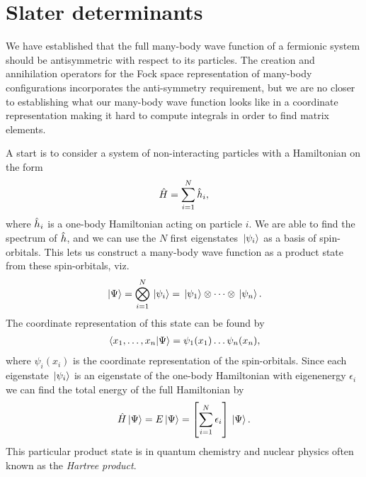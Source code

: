     \section{Slater determinants}
        \label{sec:slater-determinants}
        We have established that the full many-body wave function of a fermionic
        system should be antisymmetric with respect to its particles.
        The creation and annihilation operators for the Fock space
        representation of many-body configurations incorporates the
        anti-symmetry requirement, but we are no closer to establishing what our
        many-body wave function looks like in a coordinate representation making
        it hard to compute integrals in order to find matrix elements.

        A start is to consider a system of non-interacting particles with a
        Hamiltonian on the form
        \begin{align}
            \hat{H} = \sum_{i = 1}^{N} \hat{h}_i,
        \end{align}
        where $\hat{h}_i$ is a one-body Hamiltonian acting on particle $i$. We
        are able to find the spectrum of $\hat{h}$, and we can use the $N$
        first eigenstates $\ket*{\psi_i}$ as a basis of spin-orbitals.
        This lets us construct a many-body wave function as a product state from
        these spin-orbitals, viz.
        \begin{align}
            \ket*{\Psi}
            = \bigotimes_{i = 1}^{N}\ket*{\psi_i}
            = \ket*{\psi_1}\otimes\dots\otimes\ket*{\psi_n}.
        \end{align}
        The coordinate representation of this state can be found by
        \begin{align}
            \braket*{x_1, \dots, x_n}{\Psi}
            = \psi_1(x_1)\dots\psi_n(x_n),
        \end{align}
        where $\psi_i(x_i)$ is the coordinate representation of the
        spin-orbitals.
        Since each eigenstate $\ket*{\psi_i}$ is an eigenstate of the one-body
        Hamiltonian with eigenenergy $\epsilon_i$ we can find the total energy
        of the full Hamiltonian by
        \begin{align}
            \hat{H}\ket*{\Psi}
            = E\ket*{\Psi}
            = \left[ 
                \sum_{i = 1}^{N}
                \epsilon_i
             \right]\ket*{\Psi}.
        \end{align}
        This particular product state is in quantum chemistry and nuclear
        physics often known as the \emph{Hartree product}.
